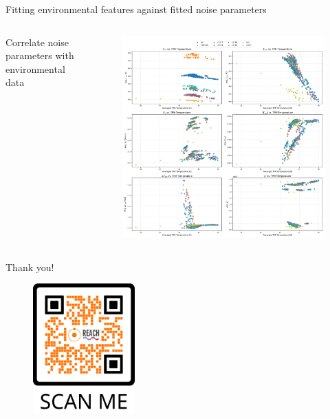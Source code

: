 \documentclass[aspectratio=169]{beamer}
\begin{document}
\begin{frame}{\small{Fitting environmental features against fitted noise parameters}}
	\begin{columns}[c]
		\begin{column}{0.45\textwidth}
			\begin{tcolorbox}[colback=blue!5!white,colframe=blue!75!black,title=]
				Correlate noise parameters with environmental data
			\end{tcolorbox}
		\end{column}
		\begin{column}{0.55\textwidth}
			\begin{figure}
				\centering
				\includegraphics[width=\textwidth]{images/pasted_image_20250605135110.png}
			\end{figure}
		\end{column}
	\end{columns}
\end{frame}


\begin{frame}{\small{Thank you!}}
	\begin{figure}
		\centering
		\includegraphics[width=0.35\textwidth]{images/qr.png}
	\end{figure}
\end{frame}
\end{document}
